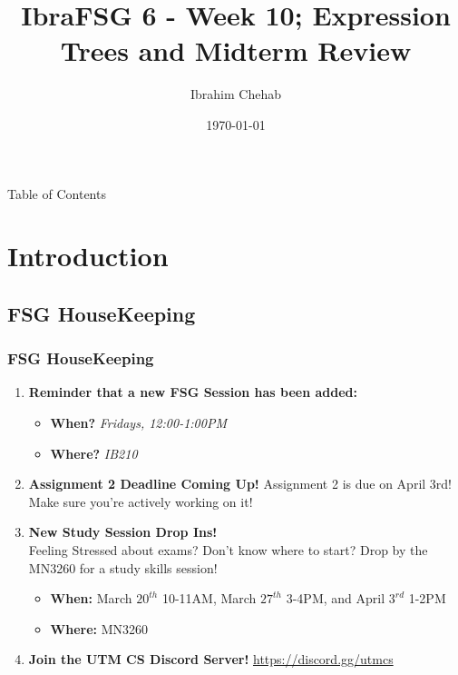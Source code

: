 \documentclass[hyperref={colorlinks,citecolor=blue,linkcolor=blue,urlcolor=blue}, aspectratio=1610]{beamer}
\title[IbraFSG 6: Midterm 2]{IbraFSG\texttrademark{} 6 - Week 10; Expression Trees and Midterm Review}
\author{Ibrahim Chehab}
\institute{UTM RGASC}
\date{\today}
\begin{document}
\begin{frame}
  \titlepage
\end{frame}

\begin{frame}{Table of Contents}
  \tableofcontents
\end{frame}

\section{Introduction}

\subsection{FSG HouseKeeping}
\begin{frame}
  \frametitle{FSG HouseKeeping}
  \begin{enumerate}
    \item \textbf{Reminder that a new FSG Session has been added:}
    \begin{itemize}
      \item \textbf{When?} \textit{Fridays, 12:00-1:00PM}
      \item \textbf{Where?} \textit{IB210}
    \end{itemize}
    \pause
    \item \textbf{Assignment 2 Deadline Coming Up!} Assignment 2 is due on April 3rd! Make sure you're actively working on it!
    \pause
    \item \textbf{New Study Session Drop Ins!} \\ Feeling Stressed about exams? Don't know where to start? Drop by the MN3260 for a study skills session! 
    \begin{itemize}
      \item \textbf{When:} March $20^{th}$ 10-11AM, March $27^{th}$ 3-4PM, and April $3^{rd}$ 1-2PM
      \item \textbf{Where:} MN3260
    \end{itemize}
    \pause
    \item \textbf{Join the UTM CS Discord Server!} \url{https://discord.gg/utmcs}
  \end{enumerate}

\end{frame}
\end{document}
